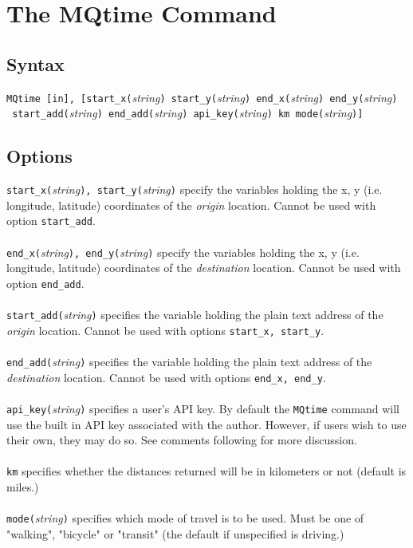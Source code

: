 \documentclass[12pt]{article}
\begin{document}
\section{The MQtime Command}

\subsection{Syntax}

\verb|MQtime [in], [start_x(|\textit{string}\verb|) start_y(|\textit{string}\verb|) end_x(|\textit{string}\verb|) end_y(|\textit{string}\verb|)| \\\verb| start_add(|\textit{string}\verb|) end_add(|\textit{string}\verb|) api_key(|\textit{string}\verb|) km mode(|\textit{string}\verb|)]|


\subsection{Options}
\verb|start_x(|\textit{string}\verb|), start_y(|\textit{string}\verb|)| specify the variables holding the x, y (i.e. longitude, latitude) coordinates of the \textit{origin} location. Cannot be used with option \verb|start_add|.
\\ \\
\verb|end_x(|\textit{string}\verb|), end_y(|\textit{string}\verb|)| specify the variables holding the x, y (i.e. longitude, latitude) coordinates of the \textit{destination} location. Cannot be used with option \verb|end_add|.
\\ \\
\verb|start_add(|\textit{string}\verb|)| specifies the variable holding the plain text address of the \textit{origin} location. Cannot be used with options \verb|start_x, start_y|.
\\ \\
\verb|end_add(|\textit{string}\verb|)| specifies the variable holding the plain text address of the \textit{destination} location. Cannot be used with options \verb|end_x, end_y|.
\\ \\
\verb|api_key(|\textit{string}\verb|)| specifies a user's API key. By default the \verb|MQtime| command will use the built in API key associated with the author. However, if users wish to use their own, they may do so. See comments following for more discussion.
\\ \\
\verb|km| specifies whether the distances returned will be in kilometers or not (default is miles.)
\\ \\
\verb|mode(|\textit{string}\verb|)| specifies which mode of travel is to be used. Must be one of "walking", "bicycle" or "transit" (the default if unspecified is driving.) 
\end{document}
